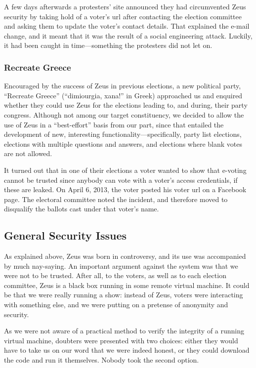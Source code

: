 \documentclass[letterpaper,10pt]{article}
\begin{document}
A few days afterwards a protesters' site announced they had
circumvented Zeus security by taking hold of a voter's {\sc url} after
contacting the election committee and asking them to update the
voter's contact details. That explained the e-mail change, and it
meant that it was the result of a social engineering attack. Luckily,
it had been caught in time---something the protesters did not let on.


\subsubsection{Recreate Greece}

Encouraged by the success of Zeus in previous elections, a new
political party, ``Recreate Greece'' (``dimiourgia, xana!'' in Greek)
approached us and enquired whether they could use Zeus for the
elections leading to, and during, their party congress. Although not
among our target constituency, we decided to allow the use of Zeus in
a ``best-effort'' basis from our part, since that entailed the
development of new, interesting functionality---specifically, party
list elections, elections with multiple questions and answers, and
elections where blank votes are not allowed.

It turned out that in one of their elections a voter wanted to show
that e-voting cannot be trusted since anybody can vote with a voter's
access credentials, if these are leaked. On April 6, 2013, the voter
posted his voter {\sc url} on a Facebook page. The electoral committee noted
the incident, and therefore moved to disqualify the ballots cast under
that voter's name. 

\subsection{General Security Issues}
\label{ssec:security-discussion}

As explained above, Zeus was born in controversy, and its use was
accompanied by much nay-saying. An important argument against the
system was that we were not to be trusted. After all, to the voters,
as well as to each election committee, Zeus is a black box running in
some remote virtual machine. It could be that we were really running a
show: instead of Zeus, voters were interacting with something else, and
we were putting on a pretense of anonymity and security. 

As we were not aware of a practical method to verify the integrity of
a running virtual machine, doubters were presented with two choices:
either they would have to take us on our word that we were indeed
honest, or they could download the code and run it themselves. Nobody
took the second option. 
\end{document}
